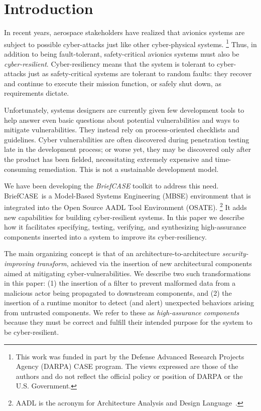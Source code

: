 \documentclass[global,twocolumn]{svjour}
\newcommand{\brfcs}{BriefCASE}
\begin{document}

\section{Introduction} \label{sec:intro}
In recent years, aerospace stakeholders have realized that avionics systems are subject to possible cyber-attacks just like other cyber-physical systems.
%
\footnote{This work was funded in part by the
Defense Advanced Research Projects Agency (DARPA) CASE program.
%
The views expressed are those of the authors and do not reflect the official
policy or position of DARPA or the U.S. Government.}
%
Thus, in addition to being fault-tolerant, safety-critical avionics systems must also be {\em cyber-resilient}.
%
Cyber-resiliency means that the system is tolerant to cyber-attacks just as safety-critical systems are tolerant to random faults: they recover and continue to execute their mission function, or safely shut down, as requirements dictate.

Unfortunately, systems designers are currently given few development tools to help answer even basic questions about potential vulnerabilities and ways to mitigate vulnerabilities.
%
They instead rely on process-oriented checklists and guidelines.
%
Cyber vulnerabilities are often discovered during penetration testing late in the development process;
%
or worse yet, they may be discovered only after the product has been fielded, necessitating extremely expensive and time-consuming remediation. This is not a sustainable development model.

We have been developing the {\em BriefCASE} toolkit to address this need.
%
\brfcs\ is a Model-Based Systems Engineering (MBSE) environment that is integrated into the Open Source AADL Tool Environment (OSATE).
%
\footnote{AADL is the acronym for Architecture Analysis and Design Language~\cite{aadl}.}
%
It adds new capabilities for building cyber-resilient systems.
%
In this paper we describe how it facilitates specifying, testing, verifying, and synthesizing high-assurance components inserted into a system to improve its cyber-resiliency.

The main organizing concept is that of an architecture-to-architecture \emph{security-improving transform}, achieved via the insertion of new architectural components aimed at mitigating cyber-vulnerabilities.
%
We describe two such transformations in this paper: (1) the insertion of a filter to prevent malformed data from a malicious actor being propagated to downstream components, and (2) the insertion of a runtime monitor to detect (and alert) unexpected behaviors arising from untrusted components.
%
We refer to these as \emph{high-assurance components} because they must be correct and fulfill their intended purpose for the system to be cyber-resilient.
\end{document}
